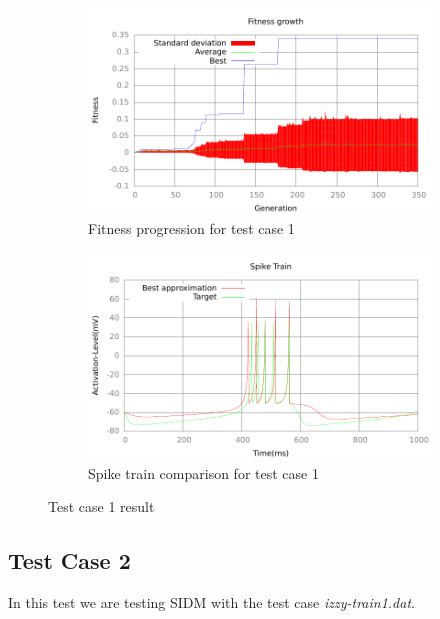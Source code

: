 \begin{figure}[h]
	\centering
	\begin{subfigure}[b]{0.5\textwidth}
		\includegraphics[width=\textwidth]{../output/stdm_izzy_1_fitness.pdf}
		\caption{Fitness progression for test case 1}
		\label{fig:fitness-test-case-1}
	\end{subfigure}%
	\begin{subfigure}[b]{0.5\textwidth}
		\includegraphics[width=\textwidth]{../output/stdm_izzy_1_spike.pdf}
		\caption{Spike train comparison for test case 1}
		\label{fig:spike-test-case-1}
	\end{subfigure}
	\caption{Test case 1 result}
\end{figure}

\subsection{Test Case 2}\label{sec:test-case-2}
In this test we are testing SIDM with the test case
\textit{izzy-train1.dat}.

